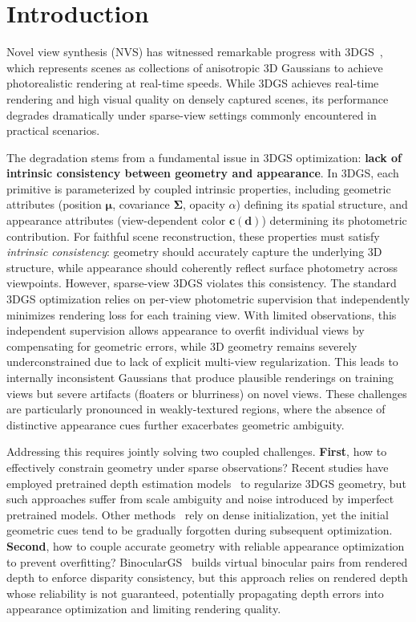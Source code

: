 \section{Introduction}
\label{sec:introduction}

Novel view synthesis (NVS) has witnessed remarkable progress with 3DGS~\cite{kerbl20233d}, which represents scenes as 
collections of anisotropic 3D Gaussians to achieve photorealistic rendering 
at real-time speeds. 
While 3DGS achieves real-time rendering and high visual quality on densely 
captured scenes, its performance degrades dramatically under 
sparse-view settings commonly encountered in practical scenarios.

The degradation stems from a fundamental issue in 3DGS optimization: 
\textbf{lack of intrinsic consistency between geometry and appearance}.
In 3DGS, each primitive is parameterized by coupled intrinsic properties, 
including geometric attributes (position $\boldsymbol{\mu}$, covariance 
$\boldsymbol{\Sigma}$, opacity $\alpha$) defining its spatial structure, 
and appearance attributes (view-dependent color $\mathbf{c}(\mathbf{d})$) 
determining its photometric contribution.
For faithful scene reconstruction, these properties must satisfy 
\emph{intrinsic consistency}: geometry should accurately capture the underlying 
3D structure, while appearance should coherently reflect surface photometry 
across viewpoints.
However, sparse-view 3DGS violates this consistency. 
The standard 3DGS optimization relies on per-view photometric supervision that 
independently minimizes rendering loss for each training view.
With limited observations, this independent supervision allows appearance to 
overfit individual views by compensating for geometric errors, while 3D geometry 
remains severely underconstrained due to lack of explicit multi-view regularization.
This leads to internally inconsistent 
Gaussians that produce plausible renderings on training views but severe 
artifacts (floaters or blurriness) on novel views.
These challenges are particularly pronounced in weakly-textured regions, 
where the absence of distinctive appearance cues further exacerbates geometric 
ambiguity.


Addressing this requires jointly solving two coupled challenges. 
\textbf{First}, how to effectively constrain geometry under sparse observations? 
Recent studies have employed pretrained depth estimation models~\cite{zhu2024fsgs,li2024dngaussian,xiong2023sparsegs, xu2025depthsplat} 
to regularize 3DGS geometry, but such approaches suffer from scale ambiguity and 
noise introduced by imperfect pretrained models. 
Other methods~\cite{zhu2024fsgs,zheng2025nexusgs} rely on dense initialization, 
yet the initial geometric cues tend to be gradually forgotten during subsequent optimization.
\textbf{Second}, how to couple accurate geometry with reliable appearance optimization to prevent overfitting? 
BinocularGS~\cite{han2024binocular} builds virtual binocular pairs from rendered depth 
to enforce disparity consistency, but this approach relies on rendered depth whose 
reliability is not guaranteed, potentially propagating depth errors into appearance optimization 
and limiting rendering quality.


